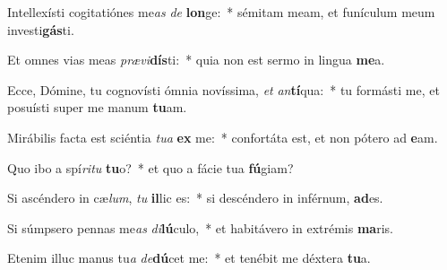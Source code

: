 \item Intellexísti cogitatiónes me\textit{as} \textit{de} \textbf{lon}ge:~* sémitam meam, et funículum meum investi\textbf{gás}ti.
\item Et omnes vias meas \textit{præ}\textit{vi}\textbf{dís}ti:~* quia non est sermo in lingua \textbf{me}a.
\item Ecce, Dómine, tu cognovísti ómnia novíssima, \textit{et} \textit{an}\textbf{tí}qua:~* tu formásti me, et posuísti super me manum \textbf{tu}am.
\item Mirábilis facta est sciéntia \textit{tu}\textit{a} \textbf{ex} me:~* confortáta est, et non pótero ad \textbf{e}am.
\item Quo ibo a spí\textit{ri}\textit{tu} \textbf{tu}o?~* et quo a fácie tua \textbf{fú}giam?
\item Si ascéndero in cæ\textit{lum}, \textit{tu} \textbf{il}lic es:~* si descéndero in inférnum, \textbf{ad}es.
\item Si súmpsero pennas me\textit{as} \textit{di}\textbf{lú}culo,~* et habitávero in extrémis \textbf{ma}ris.
\item Etenim illuc manus tu\textit{a} \textit{de}\textbf{dú}cet me:~* et tenébit me déxtera \textbf{tu}a.

